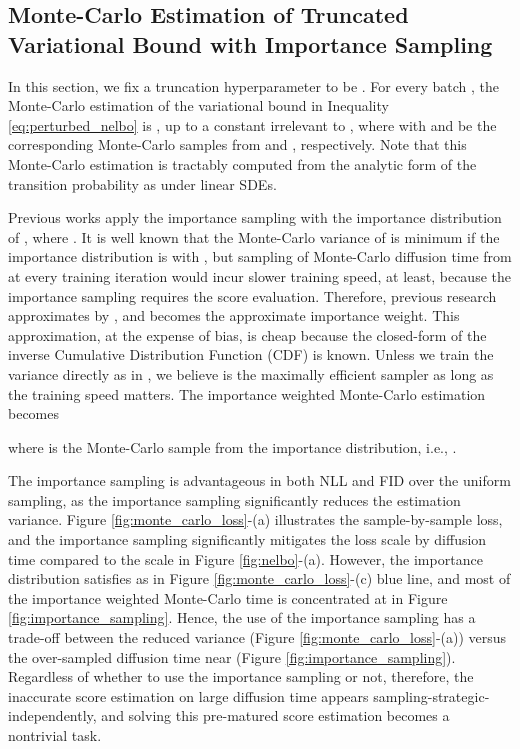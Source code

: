 \documentclass[nohyperref]{article}
\theoremstyle{plain}
\theoremstyle{definition}
\theoremstyle{remark}
\begin{document}
\subsection{Monte-Carlo Estimation of Truncated Variational Bound with Importance Sampling}\label{sec:monte_carlo}

In this section, we fix a truncation hyperparameter to be . For every batch , the Monte-Carlo estimation of the variational bound in Inequality \eqref{eq:perturbed_nelbo} is , up to a constant irrelevant to , where  with  and  be the corresponding Monte-Carlo samples from  and , respectively. Note that this Monte-Carlo estimation is tractably computed from the analytic form of the transition probability as  under linear SDEs.

Previous works \cite{song2021maximum,huang2021variational} apply the importance sampling with the importance distribution of , where . It is well known \cite{goodfellow2016deep} that the Monte-Carlo variance of  is minimum if the importance distribution is  with , but sampling of Monte-Carlo diffusion time from  at every training iteration would incur  slower training speed, at least, because the importance sampling requires the score evaluation. Therefore, previous research approximates  by , and  becomes the approximate importance weight. This approximation, at the expense of bias, is cheap because the closed-form of the inverse Cumulative Distribution Function (CDF) is known. Unless we train the variance directly as in \citet{kingma2021variational}, we believe  is the maximally efficient sampler as long as the training speed matters. The importance weighted Monte-Carlo estimation becomes

where  is the Monte-Carlo sample from the importance distribution, i.e., . 

The importance sampling is advantageous in both NLL and FID \cite{song2021maximum} over the uniform sampling, as the importance sampling significantly reduces the estimation variance. Figure \ref{fig:monte_carlo_loss}-(a) illustrates the sample-by-sample loss, and the importance sampling significantly mitigates the loss scale by diffusion time compared to the scale in Figure \ref{fig:nelbo}-(a). However, the importance distribution satisfies  as  in Figure \ref{fig:monte_carlo_loss}-(c) blue line, and most of the importance weighted Monte-Carlo time is concentrated at  in Figure \ref{fig:importance_sampling}. Hence, the use of the importance sampling has a trade-off between the reduced variance (Figure \ref{fig:monte_carlo_loss}-(a)) versus the over-sampled diffusion time near  (Figure \ref{fig:importance_sampling}). Regardless of whether to use the importance sampling or not, therefore, the inaccurate score estimation on large diffusion time appears sampling-strategic-independently, and solving this pre-matured score estimation becomes a nontrivial task. 
\end{document}
